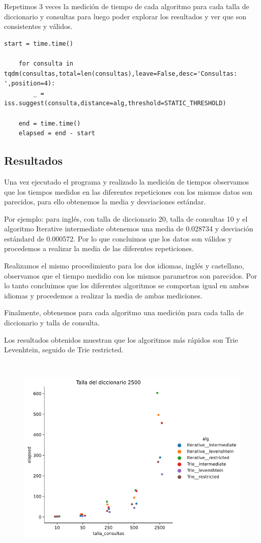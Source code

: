 Repetimos 3 veces la medición de tiempo de cada algoritmo para cada talla de diccionario y consultas para luego poder explorar los resultados y ver que son consistentes y válidos.
\begin{lstlisting}[caption=medición de tiempos]
    start = time.time()
                        
    for consulta in tqdm(consultas,total=len(consultas),leave=False,desc='Consultas: ',position=4):
        _ = iss.suggest(consulta,distance=alg,threshold=STATIC_THRESHOLD)

    end = time.time()
    elapsed = end - start
\end{lstlisting}

\subsection{Resultados}

Una vez ejecutado el programa y realizado la medición de tiempos observamos que los tiempos medidos en las diferentes repeticiones con los mismos datos son parecidos, para ello obtenemos la media y desviaciones estándar.

Por ejemplo: para inglés, con talla de diccionario 20, talla de consultas 10 y el algoritmo Iterative intermediate obtenemos una media de 0.028734 y desviación estándard de 0.000572. Por lo que concluimos que los datos son válidos y procedemos a realizar la media de las diferentes repeticiones.

Realizamos el mismo procedimiento para los dos idiomas, inglés y castellano, observamos que el tiempo medidio con los mismos parametros son parecidos. Por lo tanto concluimos que los diferentes algoritmos se comportan igual en ambos idiomas y procedemos a realizar la media de ambas mediciones.

Finalmente, obtenemos para cada algoritmo una medición para cada talla de diccionario y talla de consulta.

Los resultados obtenidos muestran que los algoritmos más rápidos son Trie Levenhtein, seguido de Trie restricted.

\begin{figure}[h]
\includegraphics[width=15cm, height=10cm]{images/grafico.png}
\centering
\end{figure}

\newpage 